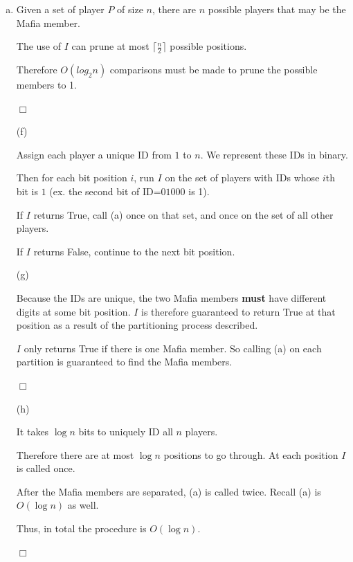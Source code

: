 \documentclass[10pt]{article}
\newenvironment{proof}{\par\noindent{\it Proof.}\hspace*{1em}}{$\Box$\bigskip}
\begin{document}
{\begin{enumerate}[(a)]
{\begin{proof}
            \end{proof}
        }
        \item {
            \begin{proof}

                Given a set of player $P$ of size $n$, 
                there are $n$ possible players that may be the Mafia member. 

                The use of $I$ can prune at most $\lceil \frac{n}{2} \rceil$ possible positions. 

                Therefore $O(log_2 n)$ comparisons must be made to prune the possible members to 1. 

            \end{proof}
        }
        \item[(f)] {
            Assign each player a unique ID from $1$ to $n$. 
            We represent these IDs in binary. 

            Then for each bit position $i$, 
            run $I$ on the set of players with IDs whose $i$th bit is $1$ 
            (ex. the second bit of ID=$01000$ is 1). 

            If $I$ returns True, call (a) once on that set, 
            and once on the set of all other players. 

            If $I$ returns False, continue to the next bit position. 
        }

        \item[(g)] {
            \begin{proof}
                
                Because the IDs are unique, 
                the two Mafia members \textbf{must} have different digits at some bit position. 
                $I$ is therefore guaranteed to return True at that position as a result of the partitioning process described. 

                $I$ only returns True if there is one Mafia member. 
                So calling (a) on each partition is guaranteed to find the Mafia members. 
                
            \end{proof}
        }
        \item[(h)] {
            \begin{proof}

                It takes $\log n$ bits to uniquely ID all $n$ players. 

                Therefore there are at most $\log n$ positions to go through. 
                At each position $I$ is called once. 

                After the Mafia members are separated, (a) is called twice. 
                Recall (a) is $O(\log n)$ as well. 

                Thus, in total the procedure is $O(\log n)$. 

            \end{proof}
        }
    \end{enumerate}
}
\end{document}
